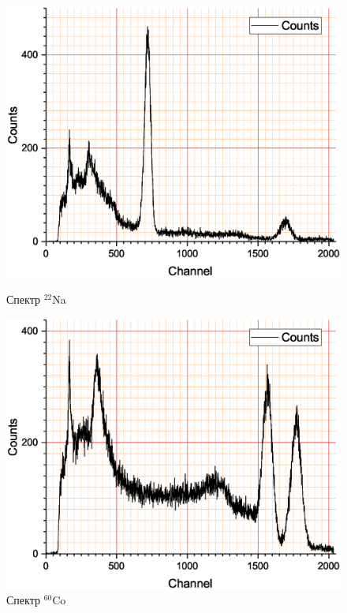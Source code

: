 \documentclass[a4paper]{article}
\begin{document}
\begin{figure}
	\begin{center}
		\begin{minipage}{0.49\linewidth}
			\includegraphics[width=1\linewidth]{na.eps}
			\caption{Спектр $^{22}$Na} %
			\label{fig:first}
		\end{minipage}
		\hfill 
		\begin{minipage}{0.49\linewidth}
			\includegraphics[width=1\linewidth]{co.eps}
			\caption{Спектр $^{60}$Co}
			\label{ris:experimcoded}

\end{minipage}
\end{center}
\end{figure}
\end{document}
